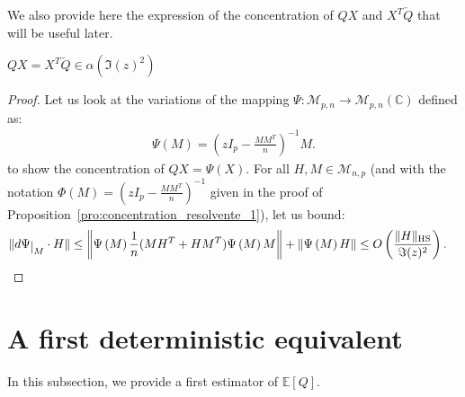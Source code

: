 \documentclass[ECP, preprint]{ejpecp} %
\newcommand\restrict[2]{{#1}\raisebox{-.5ex}{$|$}_{#2}}
\DeclareMathOperator{\hs}{HS}
\begin{document}
We also provide here the expression of the concentration of $QX$ and $X^T\check Q$ that will be useful later.
\begin{lemma}\label{lem:concentration_QX_s_z}
  $Q X =  X^T \check Q  \in \alpha \left( \Im(z)^2 \right)$
\end{lemma}
\begin{proof}
  Let us look at the variations of the mapping $\Psi : \mathcal M_{p,n} \to \mathcal M_{p, n}(\mathbb C)$ defined as:
  \begin{align*}
     \Psi(M) =  \left(zI_p - \frac{MM^T}{n}\right)^{-1} M.
   \end{align*}
   to show the concentration of $Q X  = \Psi(X)$. 
   For all $H, M \in \mathcal M_{n,p}$ (and with the notation $\Phi(M) = \left(zI_p - \frac{MM^T}{n}\right)^{-1} $ given in the proof of Proposition~\ref{pro:concentration_resolvente_1}), let us bound:
  \begin{align*}
    \|\restrict{d\Psi }{M} \cdot H\| 
    & \leq \left\Vert \Psi \left(M\right)\frac{1}{n}(MH^T + HM^T) \Psi \left(M\right) M\right\Vert + \left\Vert \Psi \left(M\right)H\right\Vert
    \leq O \left(\frac{\|H\|_{\hs}}{\Im(z)^2}\right).
  \end{align*}
\end{proof}


\section{A first deterministic equivalent}

In this subsection, we provide a first estimator of $\mathbb E [Q]$. 
\end{document}
